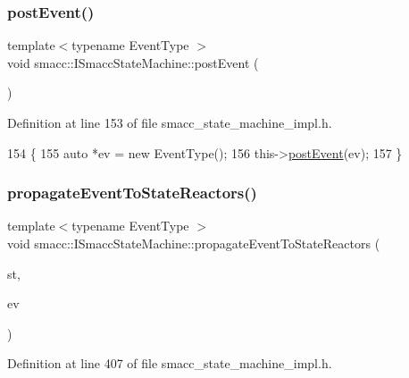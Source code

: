 \subsubsection{\texorpdfstring{post\+Event()}{postEvent()}\hspace{0.1cm}{\footnotesize\ttfamily [2/2]}}
{\footnotesize\ttfamily template$<$typename Event\+Type $>$ \\
void smacc\+::\+I\+Smacc\+State\+Machine\+::post\+Event (\begin{DoxyParamCaption}{ }\end{DoxyParamCaption})}



Definition at line 153 of file smacc\+\_\+state\+\_\+machine\+\_\+impl.\+h.


\begin{DoxyCode}
154 \{
155     \textcolor{keyword}{auto} *ev = \textcolor{keyword}{new} EventType();
156     this->\hyperlink{classsmacc_1_1ISmaccStateMachine_a1549189caf29520514e677ca46f57348}{postEvent}(ev);
157 \}
\end{DoxyCode}
\mbox{\label{classsmacc_1_1ISmaccStateMachine_a3d369c7cff22632ca85a8656000ba19c}} 
\subsubsection{\texorpdfstring{propagate\+Event\+To\+State\+Reactors()}{propagateEventToStateReactors()}}
{\footnotesize\ttfamily template$<$typename Event\+Type $>$ \\
void smacc\+::\+I\+Smacc\+State\+Machine\+::propagate\+Event\+To\+State\+Reactors (\begin{DoxyParamCaption}\item[{\hyperlink{classsmacc_1_1ISmaccState}{I\+Smacc\+State} $\ast$}]{st,  }\item[{Event\+Type $\ast$}]{ev }\end{DoxyParamCaption})\hspace{0.3cm}{\ttfamily [private]}}



Definition at line 407 of file smacc\+\_\+state\+\_\+machine\+\_\+impl.\+h.



